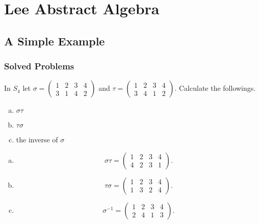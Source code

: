\chapter{Lee Abstract Algebra}

\section{A Simple Example}

\subsection{Solved Problems}

\begin{problem}
	In $ S_4 $ let $ \sigma = \begin{pmatrix} 1 & 2 & 3 & 4 \\ 3 & 1 & 4 & 2 \end{pmatrix} $ and $ \tau  = \begin{pmatrix} 1 & 2 & 3 & 4 \\ 3 & 4 & 1 & 2 \end{pmatrix} $. Calculate the followings.
	\begin{enumerate}[(a)]
		\item $ \sigma \tau $
		\item $ \tau\sigma $
		\item the inverse of $ \sigma $
	\end{enumerate}
\end{problem}
\begin{solution}
	\begin{enumerate}[(a)]
		\item 
		\[ \sigma\tau = \begin{pmatrix} 1 & 2 & 3 & 4 \\ 4 & 2 & 3 & 1 \end{pmatrix}. \]
		\item 
		\[ \tau \sigma = \begin{pmatrix} 1 & 2 & 3 & 4 \\ 1 & 3 & 2 & 4 \end{pmatrix}. \]
		\item \[ \sigma^{-1} = \begin{pmatrix} 1 & 2 & 3 & 4 \\ 2 & 4 & 1 & 3 \end{pmatrix}. \]
	\end{enumerate}
\end{solution}


